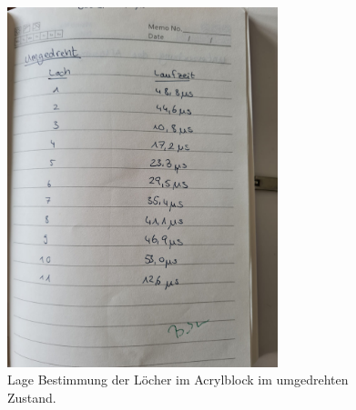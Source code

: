 \begin{figure}
    \centering
    \includegraphics[width=0.7\textwidth]{messwerte/index4.jpg}
    \caption{Lage Bestimmung der Löcher im Acrylblock im umgedrehten Zustand.}
\end{figure}